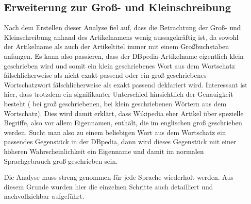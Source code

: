 \subsection{Erweiterung zur Groß- und Kleinschreibung}
Nach dem Erstellen dieser Analyse fiel auf, dass die Betrachtung der Groß- und Kleinschreibung anhand des Artikelnamens wenig aussagekräftig ist, da sowohl der Artikelname als 
auch der Artikeltitel immer mit einem Großbuchstaben anfangen. Es kann also passieren, dass der DBpedia-Artikelname eigentlich klein geschrieben wird und somit ein klein geschriebenes Wort 
aus dem Wortschatz fälschlicherweise als nicht exakt passend oder ein groß geschriebenes Wortschatzwort fälschlicherweise als exakt passend deklariert wird.
Interessant ist hier, dass trotzdem ein signifikanter Unterschied hinsichtlich der Genauigkeit besteht ( bei groß geschriebenen,  bei klein geschriebenen Wörtern aus dem Wortschatz).
Dies wird damit erklärt, dass Wikipedia eher Artikel über spezielle Begriffe, also vor allem Eigennamen, enthält, die im englischen groß geschrieben werden.
Sucht man also zu einem beliebigen Wort aus dem Wortschatz ein passendes Gegenstück in der DBpedia, dann wird dieses Gegenstück mit einer höheren Wahrscheinlichkeit ein Eigenname und damit 
im normalen Sprachgebrauch groß geschrieben sein.

\begin{rem}
Die Analyse muss streng genommen für jede Sprache wiederholt werden. Aus diesem Grunde wurden hier die einzelnen Schritte auch detailliert und nachvollziehbar aufgeführt.
\end{rem}
\fi
